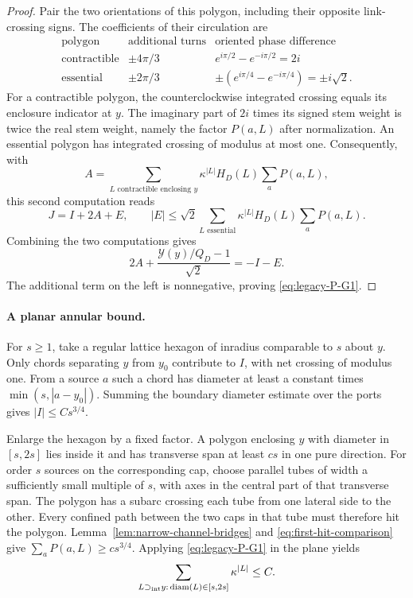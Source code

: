 \begin{proof}
Pair the two orientations of this polygon, including their opposite link-crossing signs. The coefficients of their circulation are
\[
\begin{array}{c|c|c}
 \text{polygon}&\text{additional turns}&\text{oriented phase difference}\\ \hline
 \text{contractible}&\pm4\pi/3&e^{i\pi/2}-e^{-i\pi/2}=2i\\
 \text{essential}&\pm2\pi/3&\pm(e^{i\pi/4}-e^{-i\pi/4})=\pm i\sqrt2.
\end{array}
\]
For a contractible polygon, the counterclockwise integrated crossing equals its enclosure indicator at $y$. The imaginary part of $2i$ times its signed stem weight is twice the real stem weight, namely the factor $P(a,L)$ after normalization. An essential polygon has integrated crossing of modulus at most one. Consequently, with
\[
 A=\sum_{L\text{ contractible enclosing }y}
       \kappa^{|L|}H_D(L)\sum_aP(a,L),
\]
this second computation reads
\begin{equation}\label{eq:prefix-current-circulation}
 J=I+2A+E,\qquad
 |E|\le\sqrt2\sum_{L\text{ essential}}
       \kappa^{|L|}H_D(L)\sum_aP(a,L).
\end{equation}
Combining the two computations gives
\[
 2A+\frac{\mathcal Y(y)/Q_D-1}{\sqrt2}=-I-E.
\]
The additional term on the left is nonnegative, proving \eqref{eq:legacy-P-G1}.
\end{proof}

\paragraph{A planar annular bound.}
For $s\ge1$, take a regular lattice hexagon of inradius comparable to $s$ about $y$. Only chords separating $y$ from $y_0$ contribute to $I$, with net crossing of modulus one. From a source $a$ such a chord has diameter at least a constant times $\min(s,|a-y_0|)$. Summing the boundary diameter estimate over the ports gives $|I|\le Cs^{3/4}$.

Enlarge the hexagon by a fixed factor. A polygon enclosing $y$ with diameter in $[s,2s]$ lies inside it and has transverse span at least $cs$ in one pure direction. For order $s$ sources on the corresponding cap, choose parallel tubes of width a sufficiently small multiple of $s$, with axes in the central part of that transverse span. The polygon has a subarc crossing each tube from one lateral side to the other. Every confined path between the two caps in that tube must therefore hit the polygon. Lemma~\ref{lem:narrow-channel-bridges} and \eqref{eq:first-hit-comparison} give $\sum_aP(a,L)\ge cs^{3/4}$. Applying \eqref{eq:legacy-P-G1} in the plane yields
\begin{equation}
 \sum_{L\supset_{\rm int}y:\,\operatorname{diam}(L)\in[s,2s]}
       \kappa^{|L|}\le C.
 \label{eq:legacy-P-G2}
\end{equation}

